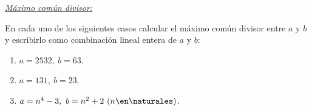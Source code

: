 \textit{\underline{Máximo común divisor:}}

\ejercicio
En cada uno de los siguientes casos calcular el máximo común divisor entre $a$ y $b$ y escribirlo como combinación lineal entera de $a$ y $b$:
\begin{enumerate}[label=\roman*)]
	\item $a = 2532,\ b = 63$.
	\item $a = 131,\ b = 23$.
	\item $a = n^4 - 3,\ b = n^2 + 2\ (n \en \naturales)$.
\end{enumerate}

\separadorCorto

\Hacer
